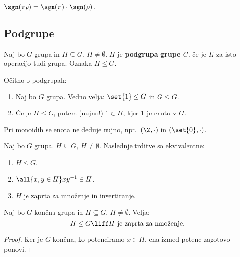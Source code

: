 \begin{trditev}
    $\sgn(\pi \rho) = \sgn(\pi) \cdot \sgn(\rho)$.
\end{trditev}

\subsection{Podgrupe}
\begin{definicija}
    Naj bo $G$ grupa in $H \subseteq G, \ H \neq \emptyset$. $H$ je \textbf{podgrupa grupe $G$}, če je $H$ za isto operacijo tudi grupa. Oznaka $H \leq G$.
\end{definicija}

\begin{opomba} 
    Očitno o podgrupah:
    \begin{enumerate}
        \item Naj bo $G$ grupa. Vedno velja: $\set{1} \leq G$ in $G \leq G$.
        \item Če je $H \leq G$, potem (nujno!) $1 \in H$, kjer $1$ je enota v $G$.
    \end{enumerate}
\end{opomba}

\begin{opomba}
    Pri monoidih se enota ne deduje nujno, npr.\ $(\Z, \cdot)$ in $(\set{0}, \cdot)$.
\end{opomba}

\begin{trditev}
    Naj bo $G$ grupa, $H \subseteq G, \ H \neq \emptyset$. Naslednje trditve so ekvivalentne:
    \begin{enumerate}
        \item $H \leq G$.
        \item $\all{x,y \in H} xy^{-1} \in H$.
        \item $H$ je zaprta za množenje in invertiranje.
    \end{enumerate}
\end{trditev}

\begin{posledica}
    Naj bo $G$ končna grupa in $H \subseteq G, \ H \neq \emptyset$. Velja: 
    $$H \leq G \liff H \text{ je zaprta za množenje}.$$
\end{posledica}

\begin{proof}
    Ker je $G$ končna, ko potenciramo $x \in H$, ena izmed potenc zagotovo ponovi.
\end{proof}

